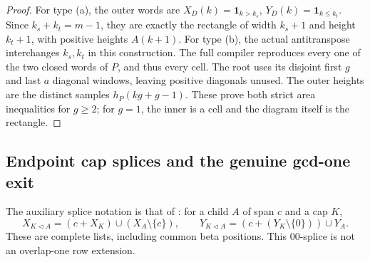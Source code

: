 \documentclass[11pt,a4paper]{amsart}
\numberwithin{equation}{section}
\theoremstyle{plain}
\theoremstyle{definition}
\newcommand{\one}{\mathbf1}
\begin{document}
\begin{proof}
For type (a), the outer words are
\(X_D(k)=\one_{k>k_s}\), \(Y_D(k)=\one_{k\le k_t}\).
Since \(k_s+k_t=m-1\), they are exactly the rectangle of width
\(k_s+1\) and height \(k_t+1\), with positive heights \(A(k+1)\).
For type (b), the actual antitranspose interchanges \(k_s,k_t\) in this
construction.  The full compiler reproduces every one of the two closed
words of \(P\), and thus every cell.  The root uses its disjoint first
\(g\) and last \(a\) diagonal windows, leaving positive diagonals
unused.  The outer heights are the distinct samples
\(h_P(kg+g-1)\).  These prove both strict area inequalities for
\(g\ge2\); for \(g=1\), the inner is a cell and the diagram
itself is the rectangle.
\end{proof}

\subsection{Endpoint cap splices and the genuine gcd-one exit}

The auxiliary splice notation is that of
\cite[Fixed-cap rigidity]{Shields2026Coframes}: for a child \(A\) of
span \(c\) and a cap \(K\),
\[
 X_{K\triangleleft A}=(c+X_K)\cup(X_A\setminus\{c\}),\qquad
 Y_{K\triangleleft A}=(c+(Y_K\setminus\{0\}))\cup Y_A.
\]
These are complete lists, including common beta positions.  This
\(00\)-splice is not an overlap-one row extension.
\end{document}
